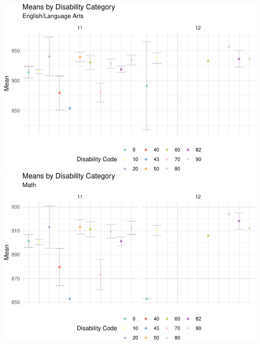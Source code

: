 \documentclass[]{article}
\begin{document}
\FloatBarrier
\includegraphics{tech_report_18_files/figure-latex/plots11-1.pdf}
\includegraphics{tech_report_18_files/figure-latex/plots11-2.pdf}

\FloatBarrier
\end{document}
